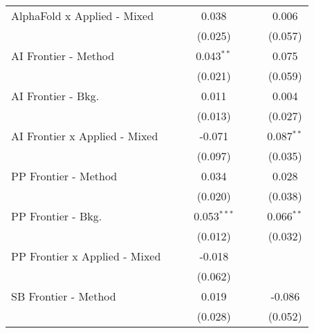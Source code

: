 \begin{tabular}{lcccccc}
   AlphaFold x Applied - Mixed   &               &               & 0.038          &               &               & 0.006\\   
                                 &               &               & (0.025)        &               &               & (0.057)\\   
   AI Frontier - Method          &               &               & 0.043$^{**}$   &               &               & 0.075\\   
                                 &               &               & (0.021)        &               &               & (0.059)\\   
   AI Frontier - Bkg.            &               &               & 0.011          &               &               & 0.004\\   
                                 &               &               & (0.013)        &               &               & (0.027)\\   
   AI Frontier x Applied - Mixed &               &               & -0.071         &               &               & 0.087$^{**}$\\   
                                 &               &               & (0.097)        &               &               & (0.035)\\   
   PP Frontier - Method          &               &               & 0.034          &               &               & 0.028\\   
                                 &               &               & (0.020)        &               &               & (0.038)\\   
   PP Frontier - Bkg.            &               &               & 0.053$^{***}$  &               &               & 0.066$^{**}$\\   
                                 &               &               & (0.012)        &               &               & (0.032)\\   
   PP Frontier x Applied - Mixed &               &               & -0.018         &               &               &   \\   
                                 &               &               & (0.062)        &               &               &   \\   
   SB Frontier - Method          &               &               & 0.019          &               &               & -0.086\\   
                                 &               &               & (0.028)        &               &               & (0.052)\\   

\end{tabular}
